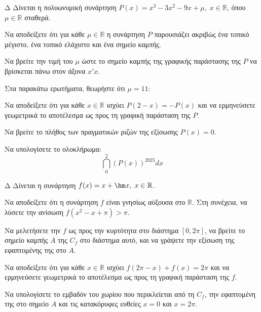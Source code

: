 \begin{thema}{Δ}
Δίνεται η πολυωνυμική συνάρτηση $\displaystyle P(x) = x^3 - 3x^2 - 9x + \mu, \; x \in \mathbb{R}$, όπου $\mu \in \mathbb{R}$ σταθερά.
\begin{erwthma}
    \item Να αποδείξετε ότι για κάθε $\mu \in \mathbb{R}$ η συνάρτηση $P$ παρουσιάζει ακριβώς ένα τοπικό μέγιστο, ένα τοπικό ελάχιστο και ένα σημείο καμπής.
    \item Να βρείτε την τιμή του $\mu$ ώστε το σημείο καμπής της γραφικής παράστασης της $P$ να βρίσκεται πάνω στον άξονα $x'x$.
\end{erwthma}
Στα παρακάτω ερωτήματα, θεωρήστε ότι $\mu = 11$:
\begin{erwthma}[resume]
    \item \begin{alist}
        \item Να αποδείξετε ότι για κάθε $x \in \mathbb{R}$ ισχύει $P(2-x) = -P(x)$ και να ερμηνεύσετε γεωμετρικά το αποτέλεσμα ως προς τη γραφική παράσταση της $P$.
        \item Να βρείτε το πλήθος των πραγματικών ριζών της εξίσωσης $P(x) = 0$.
    \end{alist}
    \item Να υπολογίσετε το ολοκλήρωμα:
    \[ \dint_0^2 \left(P(x)\right)^{2025} dx \]
\end{erwthma}
\end{thema}

\begin{thema}{Δ}
Δίνεται η συνάρτηση $\displaystyle f(x) = x + \hm x, \; x \in \mathbb{R}$.
\begin{erwthma}
    \item Να αποδείξετε ότι η συνάρτηση $f$ είναι γνησίως αύξουσα στο $\mathbb{R}$. Στη συνέχεια, να λύσετε την ανίσωση $\displaystyle f(x^2 - x + \pi) > \pi$.
    \item Να μελετήσετε την $f$ ως προς την κυρτότητα στο διάστημα $[0, 2\pi]$, να βρείτε το σημείο καμπής $A$ της $C_f$ στο διάστημα αυτό, και να γράψετε την εξίσωση της εφαπτομένης της στο $A$.
    \item Να αποδείξετε ότι για κάθε $x \in \mathbb{R}$ ισχύει $f(2\pi - x) + f(x) = 2\pi$ και να ερμηνεύσετε γεωμετρικά το αποτέλεσμα ως προς τη γραφική παράσταση της $f$.
    \item Να υπολογίσετε το εμβαδόν του χωρίου που περικλείεται από τη $C_f$, την εφαπτομένη της στο σημείο $A$ και τις κατακόρυφες ευθείες $x=0$ και $x=2\pi$.
\end{erwthma}
\end{thema}

